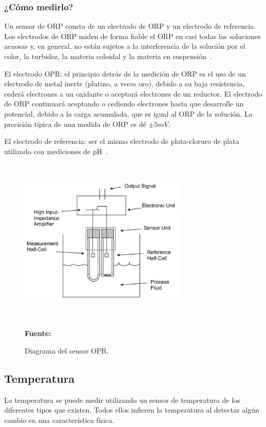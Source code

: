 \subsubsection{¿Cómo medirlo?}
Un sensor de ORP consta de un electrodo de ORP y un electrodo de referencia.
Los electrodos de ORP miden de forma fiable el ORP en casi todas las soluciones acuosas y, en general, no están sujetos a la interferencia de la solución por el color, la turbidez, la materia coloidal y la materia en suspensión~\cite{d19_committee_test_nodate}.

El electrodo OPR: el principio detr\'as de la medici\'on de ORP es el uso de un electrodo de metal inerte (platino, a veces oro), debido a su baja resistencia, ceder\'a electrones a un oxidante o aceptar\'a electrones de un reductor. 
El electrodo de ORP continuará aceptando o cediendo electrones hasta que desarrolle un potencial, debido a la carga acumulada, que es igual al ORP de la soluci\'on. 
La precisión t\'ipica de una medida de ORP es d\'e \( \pm5 mV\).

El electrodo de referencia:  ser el mismo electrodo de plata-cloruro de plata utilizado con mediciones de pH~\cite{li_chapter_2019}.

    \begin{figure}[ht]
        \centering
        \includegraphics[width=80mm, height=80mm]{Imagenes/cap2/ORP_Sensor_Image.jpg}
        \caption {Diagrama del sensor OPR. }{\textbf{Fuente:}
        \cite{orp_sensor_measure_nodate} }
        \label{fig:opr}
    \end{figure}


\subsection{Temperatura}
La temperatura se puede medir utilizando un sensor de temperatura de los diferentes tipos que existen. 
Todos ellos infieren la temperatura al detectar alg\'un cambio en una caracter\'istica f\'isica. 

